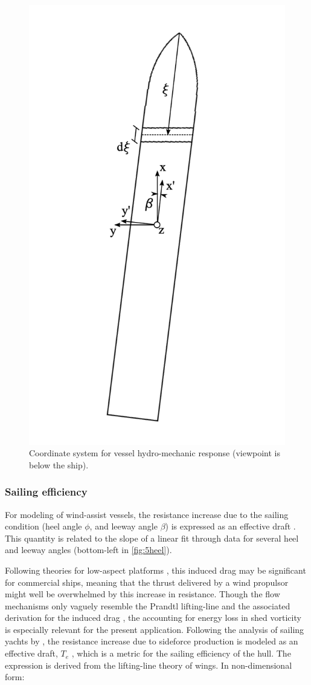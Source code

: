 \documentclass[twoside,twocolumn]{article}
\begin{document}
\begin{figure}[!ht]
	\centering
	\includegraphics[width=.7\columnwidth]{images/cut_coordinates.png}  %
	\caption{Coordinate system for vessel hydro-mechanic response (viewpoint is below the ship).}
	\label{fig:cutcoord}
\end{figure}

\subsubsection{Sailing efficiency}
For modeling of wind-assist vessels, the resistance increase due to the sailing condition (heel angle $\phi$, and leeway angle $\beta$) is expressed as an effective draft \Te. This quantity is related to the slope of a linear fit through data for several heel and leeway angles (bottom-left in \cref{fig:5heel}).

Following theories for low-aspect platforms \cite{Hoerner1985,Jones1946}, this induced drag may be significant for commercial ships, meaning that the thrust delivered by a wind propulsor might well be overwhelmed by this increase in resistance. Though the flow mechanisms only vaguely resemble the Prandtl lifting-line and the associated derivation for the induced drag \cite{Prandtl1918}, the accounting for energy loss in shed vorticity is especially relevant for the present application. Following the analysis of sailing yachts by \citet{Gerritsma1992}, the resistance increase due to sideforce production is modeled as an effective draft, $T_{e}$ \cite{Gerritsma1993}, which is a metric for the sailing efficiency of the hull. The expression is derived from the lifting-line theory of wings. In non-dimensional form:
\end{document}

